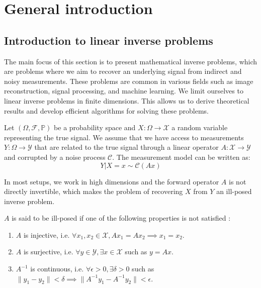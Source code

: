 \chapter{General introduction}

\section{Introduction to linear inverse problems}

The main focus of this section is to present mathematical inverse problems, which are problems where we aim to recover an underlying signal from indirect and noisy measurements. These problems are common in various fields such as image reconstruction, signal processing, and machine learning.
We limit ourselves to linear inverse problems in finite dimensions. This allows us to derive theoretical results and develop efficient algorithms for solving these problems.

Let $(\Omega, \mathcal{F}, \mathbb{P})$ be a probability space and $X: \Omega \to \mathcal{X}$ a random variable representing the true signal. We assume that we have access to measurements $Y: \Omega \to \mathcal{Y}$ that are related to the true signal through a linear operator $A: \mathcal{X} \to \mathcal{Y}$ and corrupted by a noise process $\mathcal{C}$. The measurement model can be written as:
\begin{equation}
    Y | X=x \sim \mathcal{C}(Ax)
    \label{eq:inverse-problem}
\end{equation}

In most setups, we work in high dimensions and the forward operator $A$ is not directly invertible, which makes the problem of recovering $X$ from $Y$ an ill-posed inverse problem.

\begin{definition}
    $A$ is said to be ill-posed if one of the following properties is not satisfied :
\begin{enumerate}
    \item $A$ is injective, i.e. $\forall x_1, x_2 \in \mathcal{X}, Ax_1 = Ax_2 \implies x_1 = x_2$.
    \item $A$ is surjective, i.e. $\forall y \in \mathcal{Y}, \exists x \in \mathcal{X}$ such as $y = Ax$.
    \item $A^{-1}$ is continuous, i.e. $\forall \epsilon > 0, \exists \delta > 0$ such as $\| y_1 - y_2 \| < \delta \implies \| A^{-1}y_1 - A^{-1}y_2 \| < \epsilon$.
\end{enumerate}
\end{definition}

